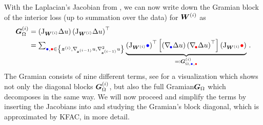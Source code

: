With the Laplacian's Jacobian from , we can now write down the Gramian block of the interior loss (up to summation over the data) for ${\bm{W}}^{(i)}$ as
\begin{align}\label{eq:fisher}
  \begin{split}
    {\bm{G}}_{\Omega}^{(i)}
    &=
      \left(
      \mathrm{J}_{{\bm{W}}^{(i)}} \Delta u
      \right)
      \left(
      \mathrm{J}_{{\bm{W}}^{(i)}} \Delta u
      \right)^{\top}
    \\
    &=
      \textstyle
      \sum_{\textcolor{blue}{\bullet}, \textcolor{red}{\bullet} \in \left\{ {\bm{z}}^{(i)}, \nabla_{\!{{\bm{z}}^{(i-1)}}}u, \nabla_{\!{{\bm{z}}^{(i-1)}}}^{2}u \right\}}
      \underbrace{
      \left(
      \mathrm{J}_{{\bm{W}}^{(i)}}\textcolor{blue}{\bullet}
      \right)^{\top}
      \left[
      \left(
      \nabla_{\!{\textcolor{blue}{\bullet}}}\Delta u
      \right)
      \left(
      \nabla_{\!{\textcolor{red}{\bullet}}}\Delta u
      \right)^{\top}
      \right]
      \left(
      \mathrm{J}_{{\bm{W}}^{(i)}}\textcolor{red}{\bullet}
      \right)}_{
      \eqqcolon {\bm{G}}_{\Omega,\textcolor{blue}{\bullet}, \textcolor{red}{\bullet}}^{(i)}
      }\,.
  \end{split}
\end{align}
The Gramian consists of nine different terms, see  for a visualization which shows not only the diagonal blocks ${\bm{G}}_{\Omega}^{(i)}$, but also the full Gramian${\bm{G}}_{\Omega}$ which decomposes in the same way.
We will now proceed and simplify the terms by inserting the Jacobians into  and studying the Gramian's block diagonal, which is approximated by KFAC, in more detail.




